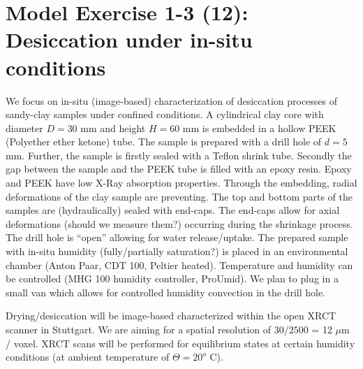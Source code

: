 \section{Model Exercise 1-3 (12): Desiccation under in-situ conditions}
\label{sec:mex12}
We focus on in-situ (image-based) characterization of desiccation processes of sandy-clay samples
under confined conditions. A cylindrical clay core with diameter $D=30$ mm and height 
$H=60$ mm is embedded in a hollow PEEK (Polyether ether ketone) tube. 
The sample is prepared with a drill hole of $d=5$ mm.
Further, the sample is 
firstly sealed with a Teflon shrink tube. Secondly the gap between the sample and the PEEK tube is filled with an epoxy resin.
Epoxy and PEEK have low X-Ray absorption properties. Through the embedding, radial deformations of the clay sample 
are preventing. The top and bottom parts of the samples are (hydraulically) sealed with end-caps. The end-caps allow for axial deformations (should we measure them?) occurring during the shrinkage process. The drill hole is ``open''  allowing for water release/uptake.
The prepared sample with in-situ humidity (fully/partially saturation?) is placed in an environmental chamber (Anton Paar, CDT 100, Peltier heated). Temperature and humidity can be controlled (MHG 100 humidity controller, ProUmid). We plan to plug in a small van which allows for controlled humidity convection in the drill hole. 

Drying/desiccation will be image-based characterized within the open XRCT scanner in Stuttgart. We are aiming for a spatial resolution of $30 / 2500$ = 12 $\mu$m / voxel. XRCT scans will be performed for equilibrium states at certain humidity conditions (at ambient temperature of $\Theta = 20^o$ C).

